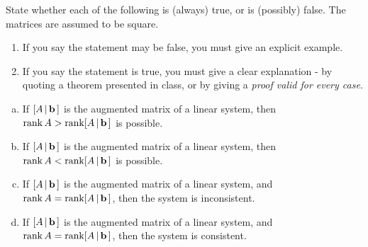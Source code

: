  \begin{prob} \label{prob14.7} State whether each of the following is (always) true,
or is (possibly) false.     The matrices are assumed to be square.  
   \smallskip    
\begin{enumerate}[$\bullet$]
\item If you say the statement may be false, you must give an explicit example.   
\item If you say the statement is true, you must give a clear explanation -   by quoting a theorem presented in class, or by giving a {\it proof valid for every  case}. 
\end{enumerate}
\medskip
\begin{enumerate}[a)]
\item If $[A\,|\,\mathbf{b}\,]$ is the augmented matrix of a linear system, then $\operatorname{rank} A > \operatorname{rank}  [A\,|\,\mathbf{b}\,]$ is possible.
\medskip
%
\item\sov  If $[A\,|\,\mathbf{b}\,]$ is the augmented matrix of a linear system, then $\operatorname{rank} A<\operatorname{rank}  [A\,|\,\mathbf{b}\,]$ is possible.
\medskip
%

\item If $[A\,|\,\mathbf{b}\,]$ is the augmented matrix of a linear system, and $\operatorname{rank} A=\operatorname{rank}  [A\,|\,\mathbf{b}\,]$, then the system  is inconsistent.\medskip %

%
\item\sov  If $[A\,|\,\mathbf{b}\,]$ is the augmented matrix of a linear system, and $\operatorname{rank} A=\operatorname{rank}  [A\,|\,\mathbf{b}\,]$, then the system  is consistent. 
 

\end{enumerate}
\end{prob}

